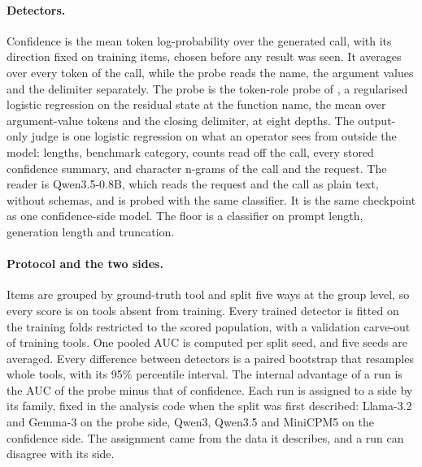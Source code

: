 \paragraph{Detectors.}
Confidence is the mean token log-probability over the generated call, with its direction fixed on training items, chosen before any result was seen. It averages over every token of the call, while the probe reads the name, the argument values and the delimiter separately. The probe is the token-role probe of \citet{healy2026internal}, a regularised logistic regression on the residual state at the function name, the mean over argument-value tokens and the closing delimiter, at eight depths. The output-only judge is one logistic regression on what an operator sees from outside the model: lengths, benchmark category, counts read off the call, every stored confidence summary, and character n-grams of the call and the request. The reader is Qwen3.5-0.8B, which reads the request and the call as plain text, without schemas, and is probed with the same classifier. It is the same checkpoint as one confidence-side model. The floor is a classifier on prompt length, generation length and truncation.

\paragraph{Protocol and the two sides.}
Items are grouped by ground-truth tool and split five ways at the group level, so every score is on tools absent from training. Every trained detector is fitted on the training folds restricted to the scored population, with a validation carve-out of training tools. One pooled AUC is computed per split seed, and five seeds are averaged. Every difference between detectors is a paired bootstrap that resamples whole tools, with its 95\% percentile interval. The internal advantage of a run is the AUC of the probe minus that of confidence. Each run is assigned to a side by its family, fixed in the analysis code when the split was first described: Llama-3.2 and Gemma-3 on the probe side, Qwen3, Qwen3.5 and MiniCPM5 on the confidence side. The assignment came from the data it describes, and a run can disagree with its side.
